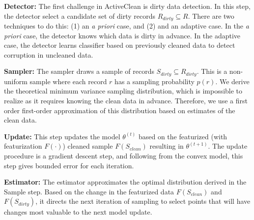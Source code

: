 \noindent\textbf{Detector: } The first challenge in ActiveClean is dirty data detection. In this step, the detector select a candidate set of dirty records $R_{dirty} \subseteq R$. There are two techniques to do this: (1) an \emph{a priori} case, and (2) and an adaptive case. In the \emph{a priori} case, the detector knows which data is dirty in advance. In the adaptive case, the detector learns classifier based on previously cleaned data to detect corruption in uncleaned data.

\vspace{0.5em}

\noindent\textbf{Sampler: } The sampler draws a sample of records $S_{dirty} \subseteq R_{dirty}$. This is a non-uniform sample where each record $r$ has a sampling probability $p(r)$.
We derive the theoretical minimum variance sampling distribution, which is impossible to realize as it requires knowing the clean data in advance. Therefore, we use a first order first-order approximation of this distribution based on estimates of the clean data. 

\vspace{0.5em}

\noindent\textbf{Update: } This step updates the model $\theta^{(t)}$ based on the featurized (with featurization $F(\cdot)$) cleaned sample $F(S_{clean})$ resulting in $\theta^{(t+1)}$. The update procedure is a gradient descent step, and following from the convex model, this step gives bounded error for each iteration.

\vspace{0.5em}

\noindent\textbf{Estimator: } The estimator approximates the optimal distribution derived in the Sample step. Based on the change in the featurized data $F(S_{clean})$ and $F(S_{dirty})$, it directs the next iteration of sampling to select points that will have changes most valuable to the next model update.



